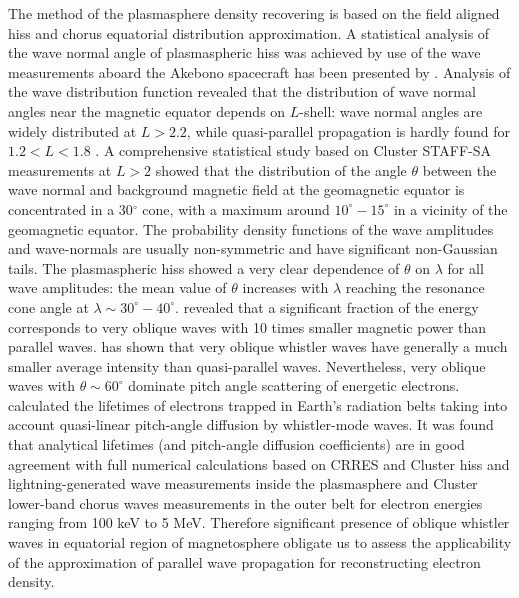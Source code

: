 \documentclass[a4paper]{article}
\begin{document}
The method of the plasmasphere density recovering is based on the field aligned hiss and chorus equatorial distribution approximation. A statistical analysis of the wave normal angle of plasmaspheric hiss was achieved by use of the wave measurements aboard the Akebono spacecraft has been presented by \citet{goto2003determination}. Analysis of the wave distribution function revealed that the distribution of wave normal angles near the magnetic equator depends on $L$-shell: wave normal angles are widely distributed at $L>2.2$, while quasi-parallel propagation is hardly found for $1.2<L<1.8$ \citep{goto2003determination}. A comprehensive statistical study based on Cluster STAFF-SA measurements \citep{agapitov2013statistics} at $L > 2$ showed that the distribution of the angle $\theta$ between the wave normal and background magnetic field at the geomagnetic equator is concentrated in a 30$^{\circ}$ cone, with a maximum around $10^{\circ}-15^{\circ}$ in a vicinity of the geomagnetic equator. The probability density functions of the wave amplitudes and wave-normals are usually non-symmetric and have significant non-Gaussian tails. The plasmaspheric hiss showed a very clear dependence of $\theta$ on $\lambda$ for all wave amplitudes: the mean value of $\theta$ increases with $\lambda$ reaching the resonance cone angle at $\lambda \sim 30^{\circ}-40^{\circ}$. \citet{artemyev2015wave} revealed that a significant fraction of the energy corresponds to very oblique waves with 10 times smaller magnetic power than parallel waves. \citet{mourenas2014consequenses} has shown that very oblique whistler waves have generally a much smaller average intensity than quasi-parallel waves. Nevertheless, very oblique waves with $\theta \sim 60^{\circ}$ dominate pitch angle scattering of energetic electrons. \citet{artemyev2014parametric} calculated the lifetimes of electrons trapped in Earth's radiation belts taking into account quasi-linear pitch-angle diffusion by whistler-mode waves. It was found that analytical lifetimes (and pitch-angle diffusion coefficients) are in good agreement with full numerical calculations based on CRRES and Cluster hiss and lightning-generated wave measurements inside the plasmasphere and Cluster lower-band chorus waves measurements in the outer belt for electron energies ranging from 100 keV to 5 MeV. Therefore significant presence of oblique whistler waves in equatorial region of magnetosphere obligate us to assess the applicability of the approximation of parallel wave propagation for reconstructing electron density.
\end{document}
